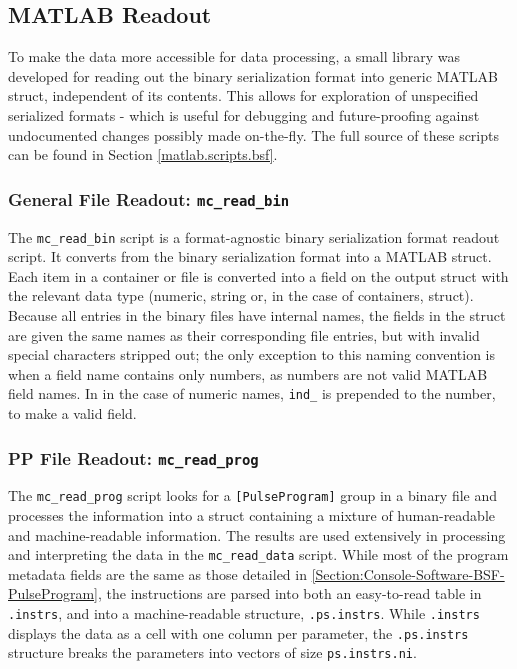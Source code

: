 \documentclass[PaulGanssle-Thesis.tex]{subfiles}
\begin{document}
\subsection{MATLAB Readout}
\label{console.software.matlab}
To make the data more accessible for data processing, a small library was developed for reading out the binary serialization format into generic MATLAB struct, independent of its contents. This allows for exploration of unspecified serialized formats - which is useful for debugging and future-proofing against undocumented changes possibly made on-the-fly. The full source of these scripts can be found in Section \ref{matlab.scripts.bsf}.

\subsubsection{General File Readout: \texttt{mc\_read\_bin}}
\label{Section:mc_read_bin}
The \texttt{mc\_read\_bin} script is a format-agnostic binary serialization format readout script. It converts from the binary serialization format into a MATLAB struct. Each item in a container or file is converted into a field on the output struct with the relevant data type (numeric, string or, in the case of containers, struct). Because all entries in the binary files have internal names, the fields in the struct are given the same names as their corresponding file entries, but with invalid special characters stripped out; the only exception to this naming convention is when a field name contains only numbers, as numbers are not valid MATLAB field names. In in the case of numeric names, \texttt{ind\_} is prepended to the number, to make a valid field. 

\subsubsection{PP File Readout: \texttt{mc\_read\_prog}}
\label{Section:mc_read_prog}
The \texttt{mc\_read\_prog} script looks for a \texttt{[PulseProgram]} group in a binary file and processes the information into a struct containing a mixture of human-readable and machine-readable information. The results are used extensively in processing and interpreting the data in the \texttt{mc\_read\_data} script. While most of the program metadata fields are the same as those detailed in \ref{Section:Console-Software-BSF-PulseProgram}, the instructions are parsed into both an easy-to-read table in \texttt{.instrs}, and into a machine-readable structure, \texttt{.ps.instrs}. While \texttt{.instrs} displays the data as a cell with one column per parameter, the \texttt{.ps.instrs} structure breaks the parameters into vectors of size \texttt{ps.instrs.ni}.
\end{document}
